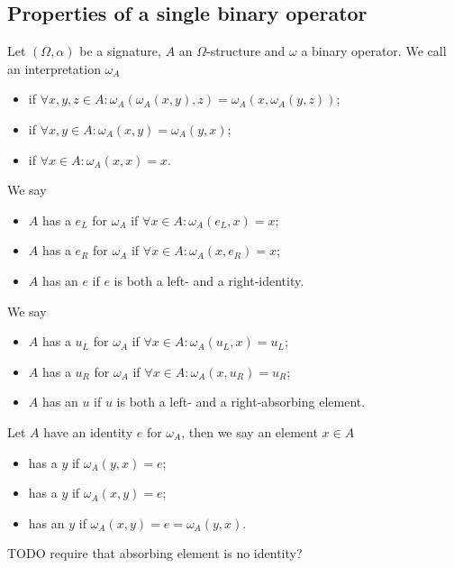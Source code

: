 \subsection{Properties of a single binary operator}
\begin{definition}
Let $(\Omega, \alpha)$ be a signature, $A$ an $\Omega$-structure and $\omega$ a binary operator. We call an interpretation $\omega_A$
\begin{itemize}
\item {} if $\forall x,y,z\in A: \omega_A(\omega_A(x,y),z) = \omega_A(x,\omega_A(y,z))$;
\item {} if $\forall x,y\in A: \omega_A(x,y) = \omega_A(y,x)$;
\item {} if $\forall x\in A: \omega_A(x,x) = x$.
\end{itemize}
We say
\begin{itemize}
\item $A$ has a  $e_L$ for $\omega_A$ if $\forall x\in A: \omega_A(e_L, x) = x$;
\item $A$ has a  $e_R$ for $\omega_A$ if $\forall x\in A: \omega_A(x, e_R) = x$;
\item $A$ has an  $e$ if $e$ is both a left- and a right-identity.
\end{itemize}
We say
\begin{itemize}
\item $A$ has a  $u_L$ for $\omega_A$ if $\forall x\in A: \omega_A(u_L, x) = u_L$;
\item $A$ has a  $u_R$ for $\omega_A$ if $\forall x\in A: \omega_A(x, u_R) = u_R$;
\item $A$ has an  $u$ if $u$ is both a left- and a right-absorbing element.
\end{itemize}
Let $A$ have an identity $e$ for $\omega_A$, then we say an element $x\in A$
\begin{itemize}
\item has a  $y$ if $\omega_A(y,x) = e$;
\item has a  $y$ if $\omega_A(x,y) = e$;
\item has an  $y$ if $\omega_A(x,y) = e = \omega_A(y,x)$.
\end{itemize}
\end{definition}

TODO require that absorbing element is no identity?

